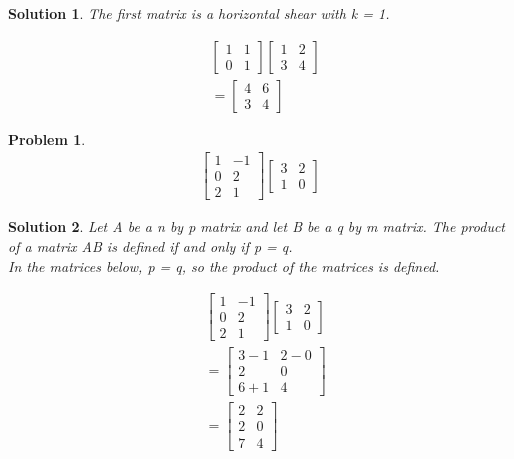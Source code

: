 \documentclass{article}
\newtheorem{problem}{Problem}
\newtheorem*{solution}{Solution}
\begin{document}
\begin{solution}
The first matrix is a horizontal shear with k = 1.

\begin{align*}
& \begin{bmatrix}
1 & 1 \\ 0 & 1
\end{bmatrix}
\begin{bmatrix}
1 & 2 \\ 3 & 4
\end{bmatrix} \\
&= 
\begin{bmatrix}
4 & 6 \\ 3 & 4
\end{bmatrix} 
\end{align*}
\end{solution}

\begin{problem}
\begin{align*}
\begin{bmatrix}
1 & -1 \\ 0 & 2 \\ 2 & 1
\end{bmatrix}
\begin{bmatrix}
3 & 2 \\ 1 & 0
\end{bmatrix}
\end{align*}
\end{problem}

\begin{solution}
Let A be a n by p matrix and let B be a q by m matrix. The product of a matrix AB is defined if and only if p = q. \\

In the matrices below, p = q, so the product of the matrices is defined.

\begin{align*}
& \begin{bmatrix}
1 & -1 \\ 0 & 2 \\ 2 & 1
\end{bmatrix}
\begin{bmatrix}
3 & 2 \\ 1 & 0
\end{bmatrix} \\
&= \begin{bmatrix}
3 - 1 & 2 - 0 \\ 2 & 0 \\ 6 + 1 & 4
\end{bmatrix} \\
&= \begin{bmatrix}
2 & 2 \\ 2 & 0 \\ 7 & 4
\end{bmatrix} 
\end{align*}
\end{solution}
\end{document}
